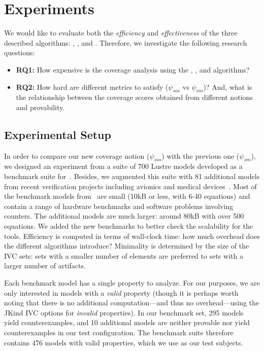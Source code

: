 \section{Experiments}
\label{sec:experiments}

We would like to evaluate both the {\em efficiency} and {\em
  effectiveness} of the three described algorithms: \ucbfalg, \ucalg, and \mustalg. Therefore, we investigate the following research questions:
\begin{itemize}
    \item \textbf{RQ1:} How expensive is the coverage analysis using the \ucalg, \mustalg, and \ucbfalg algorithms?
    \item \textbf{RQ2:} How hard are different metrics to satisfy ($\psi_{sos}$ vs $\psi_{sm}$)?  And, what is the relationship between the coverage scores obtained from different notions and provability.
\end{itemize}

\subsection{Experimental Setup}

In order to compare our new coverage notion ($\psi_{sos}$) with the previous one ($\psi_{sm}$), we designed an experiment from a suite of 700 Lustre models developed
as a benchmark suite for~\cite{Hagen08:FMCAD}. Besides, we augmented this suite
with 81 additional models from recent verification projects including
avionics and medical devices~\cite{QFCS15:backes,hilt2013}. Most of
the benchmark models from~\cite{Hagen08:FMCAD} are small (10kB or less,
with 6-40 equations) and contain a range of hardware benchmarks and
software problems involving counters. The additional models are much
larger: around 80kB with over 500 equations. We added the new
benchmarks to better check the scalability for the tools. Efficiency is computed in terms of wall-clock time: how
much overhead does the different algorithms introduce? Minimality is
determined by the size of the IVC sets: sets with a smaller number of
elements are preferred to sets with a larger number of artifacts. 

Each benchmark model has a single property to analyze.  For our purposes, we are only interested in models with a {\em valid} property (though it is perhaps worth noting that there is no additional computation---and thus no overhead---using the JKind IVC options for {\em invalid} properties).  In our benchmark set, 295 models yield counterexamples, and 10 additional models are neither provable nor yield counterexamples in our test configuration.  The benchmark suite therefore contains 476 models with valid properties, which we use as our test subjects.

